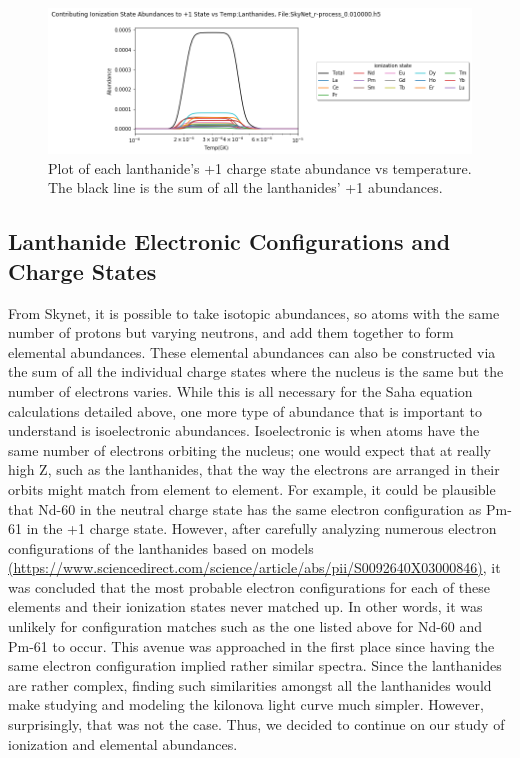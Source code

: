 \documentclass[11pt,a4paper]{article}
\begin{document}
\begin{figure}[h!]
  \includegraphics[scale = .6]{plus_one.png}
  \caption{Plot of each lanthanide's +1 charge state abundance vs temperature. The black line is the sum of all the lanthanides' +1 abundances. }
\end{figure} 

\pagebreak
 
\subsection{Lanthanide Electronic Configurations and Charge States}

\hspace{8mm} From Skynet, it is possible to take isotopic abundances, so atoms with the same number of protons but varying neutrons, and add them together to form elemental abundances. These elemental abundances can also be constructed via the sum of all the individual charge states where the nucleus is the same but the number of electrons varies. While this is all necessary for the Saha equation calculations detailed above, one more type of abundance that is important to understand is isoelectronic abundances. Isoelectronic is when atoms have the same number of electrons orbiting the nucleus; one would expect that at really high Z, such as the lanthanides, that the way the electrons are arranged in their orbits might match from element to element. For example, it could be plausible that Nd-60 in the neutral charge state has the same electron configuration as Pm-61 in the +1 charge state. However, after carefully analyzing numerous electron configurations of the lanthanides based on models \url{(https://www.sciencedirect.com/science/article/abs/pii/S0092640X03000846)}, it was concluded that the most probable electron configurations for each of these elements and their ionization states never matched up. In other words, it was unlikely for configuration matches such as the one listed above for Nd-60 and Pm-61 to occur.
This avenue was approached in the first place since having the same electron configuration implied rather similar spectra. Since the lanthanides are rather complex, finding such similarities amongst all the lanthanides would make studying and modeling the kilonova light curve much simpler. However, surprisingly, that was not the case. Thus, we decided to continue on our study of ionization and elemental abundances.
\end{document}
